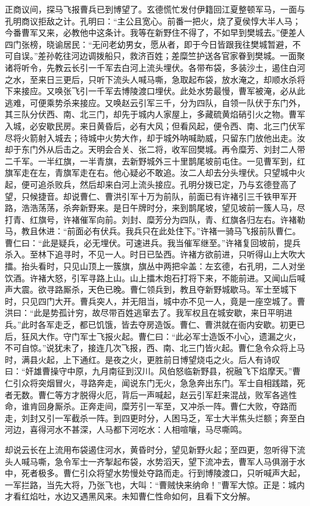 正商议间，探马飞报曹兵已到博望了。玄德慌忙发付伊籍回江夏整顿军马，一面与孔明商议拒敌之计。孔明曰：“主公且宽心。前番一把火，烧了夏侯惇大半人马；今番曹军又来，必教他中这条计。我等在新野住不得了，不如早到樊城去。”便差人四门张榜，晓谕居民：“无问老幼男女，愿从者，即于今日皆跟我往樊城暂避，不可自误。”差孙乾往河边调拨船只，救济百姓；差糜竺护送各官家眷到樊城。一面聚诸将听令，先教云长引一千军去白河上流头埋伏。各带布袋，多装沙土，遏住白河之水，至来日三更后，只听下流头人喊马嘶，急取起布袋，放水淹之，却顺水杀将下来接应。又唤张飞引一千军去博陵渡口埋伏。此处水势最慢，曹军被淹，必从此逃难，可便乘势杀来接应。又唤赵云引军三千，分为四队，自领一队伏于东门外，其三队分伏西、南、北三门，却先于城内人家屋上，多藏硫黄焰硝引火之物。曹军入城，必安歇民房。来日黄昏后，必有大风；但看风起，便令西、南、北三门伏军尽将火箭射入城去；待城中火势大作，却于城外呐喊助威，只留东门放他出走。汝却于东门外从后击之。天明会合关、张二将，收军回樊城。再令糜芳、刘封二人带二千军。一半红旗，一半青旗，去新野城外三十里鹊尾坡前屯住。一见曹军到，红旗军走在左，青旗军走在右。他心疑必不敢追。汝二人却去分头埋伏。只望城中火起，便可追杀败兵，然后却来白河上流头接应。孔明分拨已定，乃与玄德登高了望，只候捷音。却说曹仁、曹洪引军十万为前队，前面已有许褚引三千铁甲军开路，浩浩荡荡，杀奔新野来。是日午牌时分，来到鹊尾坡，望见坡前一簇人马，尽打青、红旗号，许褚催军向前。刘封、糜芳分为四队，青、红旗各归左右。许褚勒马，教且休进：“前面必有伏兵。我兵只在此处住下。”许褚一骑马飞报前队曹仁。曹仁曰：“此是疑兵，必无埋伏。可速进兵。我当催军继至。”许褚复回坡前，提兵杀入。至林下追寻时，不见一人。时日已坠西。许褚方欲前进，只听得山上大吹大擂。抬头看时，只见山顶上一簇旗，旗丛中两把伞盖：左玄德，右孔明，二人对坐饮酒。许褚大怒，引军寻路上山。山上擂木炮石打将下来，不能前进。又闻山后喊声大震。欲寻路厮杀，天色已晚。曹仁领兵到，教且夺新野城歇马。军士至城下时，只见四门大开。曹兵突人，并无阻当，城中亦不见一人，竟是一座空城了。曹洪曰：“此是势孤计穷，故尽带百姓逃窜去了。我军权且在城安歇，来日平明进兵。”此时各军走乏，都已饥饿，皆去夺房造饭。曹仁、曹洪就在衙内安歇。初更已后，狂风大作。守门军士飞报火起。曹仁曰：“此必军士造饭不小心，遗漏之火，不可自惊。”说犹未了，接连几次飞报，西、南、北三门皆火起。曹仁急令众将上马时，满县火起，上下通红。是夜之火，更胜前日博望烧屯之火。后人有诗叹曰：“奸雄曹操守中原，九月南征到汉川。风伯怒临新野县，祝融飞下焰摩天。”曹仁引众将突烟冒火，寻路奔走，闻说东门无火，急急奔出东门。军士自相践踏，死者无数。曹仁等方才脱得火厄，背后一声喊起，赵云引军赶来混战，败军各逃性命，谁肯回身厮杀。正奔走间，糜芳引一军至，又冲杀一阵。曹仁大败，夺路而走，刘封又引一军截杀一阵。到四更时分，人困马乏，军士大半焦头烂额；奔至白河边，喜得河水不甚深，人马都下河吃水：人相喧嚷，马尽嘶鸣。

却说云长在上流用布袋遏住河水，黄昏时分，望见新野火起；至四更，忽听得下流头人喊马嘶，急令军士一齐掣起布袋，水势滔天，望下流冲去，曹军人马俱溺于水中，死者极多。曹仁引众将望水势慢处夺路而走。行到博陵渡口，只听喊声大起，一军拦路，当先大将，乃张飞也，大叫：“曹贼快来纳命！”曹军大惊。正是：城内才看红焰吐，水边又遇黑风来。未知曹仁性命如何，且看下文分解。